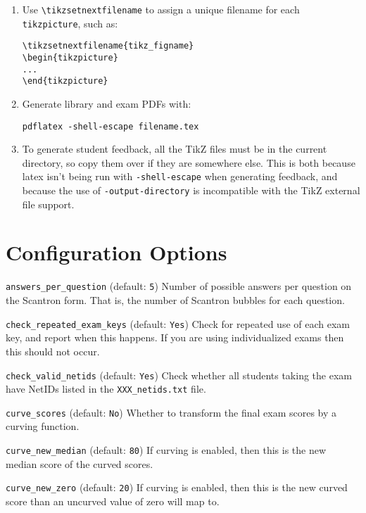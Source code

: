 \documentclass{article}
\begin{document}
\begin{enumerate}
\begin{enumerate}
  \item Use \verb+\tikzsetnextfilename+ to assign a unique filename for
    each \texttt{tikzpicture}, such as:
\begin{verbatim}
\tikzsetnextfilename{tikz_figname}
\begin{tikzpicture}
...
\end{tikzpicture}
\end{verbatim}
  \item Generate library and exam PDFs with:
\begin{verbatim}
pdflatex -shell-escape filename.tex
\end{verbatim}
  \item To generate student feedback, all the TikZ files must be in
    the current directory, so copy them over if they are somewhere
    else. This is both because latex isn't being run with
    \texttt{-shell-escape} when generating feedback, and because the
    use of \texttt{-output-directory} is incompatible with the TikZ
    external file support.
  \end{enumerate}
\end{enumerate}

\section{Configuration Options}

\hangindent=1cm \texttt{answers_per_question} (default: \texttt{5})
Number of possible answers per question on the Scantron form. That is,
the number of Scantron bubbles for each question.

\hangindent=1cm \texttt{check_repeated_exam_keys} (default:
\texttt{Yes}) Check for repeated use of each exam key, and report when
this happens. If you are using individualized exams then this should
not occur.

\hangindent=1cm \texttt{check_valid_netids} (default: \texttt{Yes})
Check whether all students taking the exam have NetIDs listed in the
\texttt{XXX_netids.txt} file.

\hangindent=1cm \texttt{curve_scores} (default: \texttt{No}) Whether
to transform the final exam scores by a curving function.

\hangindent=1cm \texttt{curve_new_median} (default: \texttt{80}) If
curving is enabled, then this is the new median score of the curved
scores.

\hangindent=1cm \texttt{curve_new_zero} (default: \texttt{20}) If
curving is enabled, then this is the new curved score than an uncurved
value of zero will map to.
\end{document}
